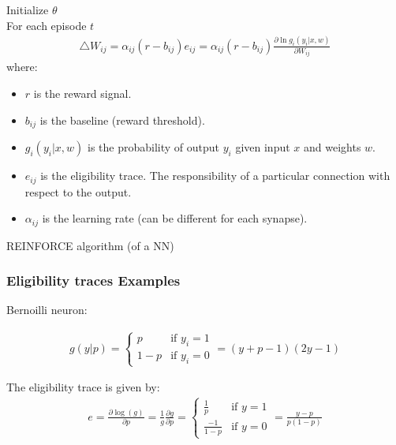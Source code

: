 \documentclass[11pt]{book} %
\begin{document}
\begin{algorithm}[H]
    \SetNoFillComment
    \SetAlgoLined
    Initialize $\theta$ \\
    For each episode $t$ \\
    \begin{align*}
        \bigtriangleup W_{ij} = \alpha_{ij}(r - b_{ij})e_{ij} = \alpha_{ij}(r - b_{ij})\frac{\partial \ln  g_i(y_i| x,w) }{\partial W_{ij}}
    \end{align*}
    where:
    \begin{itemize}
        \item $r$ is the reward signal.
        \item $b_{ij}$ is the baseline (reward threshold).
        \item $g_i(y_i| x,w)$ is the probability of output $y_i$ given input $x$ and weights $w$.
        \item $e_{ij}$ is the eligibility trace. The responsibility of a particular connection with respect to the output.
        \item $\alpha_{ij}$ is the learning rate (can be different for each synapse).
    \end{itemize}
    \caption{REINFORCE algorithm (of a NN)} \label{REINFORCE algorithm}
\end{algorithm}


\subsubsection{Eligibility traces Examples}

Bernoilli neuron:

\begin{align*}
    g(y| p) = \begin{cases}
        p & \text{if } y_i = 1 \\
        1 - p & \text{if } y_i = 0
    \end{cases}
    = (y + p -1)(2y -1)
\end{align*}

The eligibility trace is given by:
\begin{align*}
    e = \frac{\partial \log(g)}{\partial p} = \frac{1}{g} \frac{\partial g}{\partial p} = 
    \begin{cases} 
    \frac{1}{p} & \text{if } y = 1 \\
    \frac{-1}{1-p} & \text{if } y = 0 
    \end{cases}
    = \frac{y - p}{p(1 - p)}
\end{align*}
\end{document}
